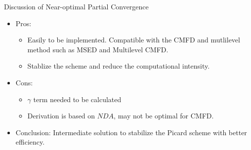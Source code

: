 \begin{frame}{Discussion of Near-optimal Partial Convergence}
\vspace{-1em}
 \begin{itemize}
     \item Pros:
     \begin{itemize}
         \item Easily to be implemented. Compatible with the CMFD and mutlilevel method such as MSED and Multilevel CMFD.
         \item Stablize the scheme and reduce the computational intensity.
     \end{itemize}
     \item Cons:
     \begin{itemize}
         \item $\gamma$ term needed to be calculated
         \item Derivation is based on $NDA$, may not be optimal for CMFD.
     \end{itemize}
     \item Conclusion: Intermediate solution to stabilize the Picard scheme with better efficiency. 
 \end{itemize}
 \end{frame}

